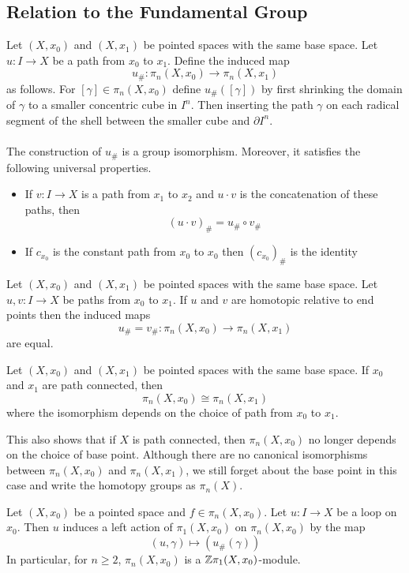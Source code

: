 \documentclass[a4paper]{article}
\begin{document}
\subsection{Relation to the Fundamental Group}
\begin{thm}{}{} Let $(X,x_0)$ and $(X,x_1)$ be pointed spaces with the same base space. Let $u:I\to X$ be a path from $x_0$ to $x_1$. Define the induced map $$u_\#:\pi_n(X,x_0)\to\pi_n(X,x_1)$$ as follows. For $[\gamma]\in\pi_n(X,x_0)$ define $u_\#([\gamma])$ by first shrinking the domain of $\gamma$ to a smaller concentric cube in $I^n$. Then inserting the path $\gamma$ on each radical segment of the shell between the smaller cube and $\partial I^n$. \\~\\
The construction of $u_\#$ is a group isomorphism. Moreover, it satisfies the following universal properties. 
\begin{itemize}
\item If $v:I\to X$ is a path from $x_1$ to $x_2$ and $u\cdot v$ is the concatenation of these paths, then $$(u\cdot v)_\#=u_\#\circ v_\#$$
\item If $c_{x_0}$ is the constant path from $x_0$ to $x_0$ then $(c_{x_0})_\#$ is the identity
\end{itemize}
\end{thm}

\begin{prp}{}{} Let $(X,x_0)$ and $(X,x_1)$ be pointed spaces with the same base space. Let $u,v:I\to X$ be paths from $x_0$ to $x_1$. If $u$ and $v$ are homotopic relative to end points then the induced maps $$u_\#=v_\#:\pi_n(X,x_0)\to\pi_n(X,x_1)$$ are equal. 
\end{prp}

\begin{crl}{}{} Let $(X,x_0)$ and $(X,x_1)$ be pointed spaces with the same base space. If $x_0$ and $x_1$ are path connected, then $$\pi_n(X,x_0)\cong\pi_n(X,x_1)$$ where the isomorphism depends on the choice of path from $x_0$ to $x_1$. 
\end{crl}

This also shows that if $X$ is path connected, then $\pi_n(X,x_0)$ no longer depends on the choice of base point. Although there are no canonical isomorphisms between $\pi_n(X,x_0)$ and $\pi_n(X,x_1)$, we still forget about the base point in this case and write the homotopy groups as $\pi_n(X)$. 

\begin{prp}{}{} Let $(X,x_0)$ be a pointed space and $f\in\pi_n(X,x_0)$. Let $u:I\to X$ be a loop on $x_0$. Then $u$ induces a left action of $\pi_1(X,x_0)$ on $\pi_n(X,x_0)$ by the map $$(u,\gamma)\mapsto\left(u_\#(\gamma)\right)$$ In particular, for $n\geq 2$, $\pi_n(X,x_0)$ is a $\mathbb{Z}\pi_1(X,x_0)$-module. 
\end{prp}
\end{document}

